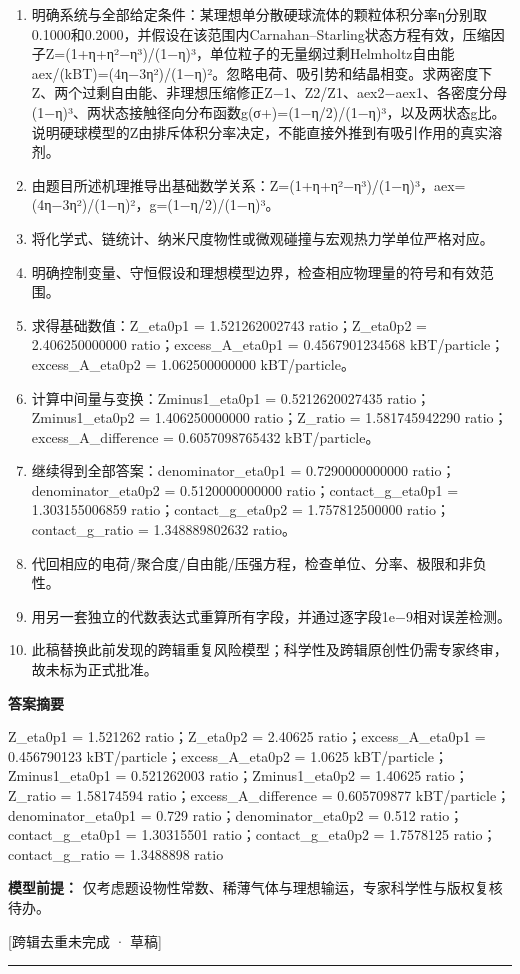 \documentclass[UTF8,11pt,a4paper]{ctexart}
\begin{document}
\begin{enumerate}
\item 明确系统与全部给定条件：某理想单分散硬球流体的颗粒体积分率η分别取0.1000和0.2000，并假设在该范围内Carnahan–Starling状态方程有效，压缩因子Z=(1+η+η²−η³)/(1−η)³，单位粒子的无量纲过剩Helmholtz自由能aex/(kBT)=(4η−3η²)/(1−η)²。忽略电荷、吸引势和结晶相变。求两密度下Z、两个过剩自由能、非理想压缩修正Z−1、Z2/Z1、aex2−aex1、各密度分母(1−η)³、两状态接触径向分布函数g(σ+)=(1−η/2)/(1−η)³，以及两状态g比。说明硬球模型的Z由排斥体积分率决定，不能直接外推到有吸引作用的真实溶剂。
\item 由题目所述机理推导出基础数学关系：Z=(1+η+η²−η³)/(1−η)³，aex=(4η−3η²)/(1−η)²，g=(1−η/2)/(1−η)³。
\item 将化学式、链统计、纳米尺度物性或微观碰撞与宏观热力学单位严格对应。
\item 明确控制变量、守恒假设和理想模型边界，检查相应物理量的符号和有效范围。
\item 求得基础数值：Z\_eta0p1 = 1.521262002743 ratio；Z\_eta0p2 = 2.406250000000 ratio；excess\_A\_eta0p1 = 0.4567901234568 kBT/particle；excess\_A\_eta0p2 = 1.062500000000 kBT/particle。
\item 计算中间量与变换：Zminus1\_eta0p1 = 0.5212620027435 ratio；Zminus1\_eta0p2 = 1.406250000000 ratio；Z\_ratio = 1.581745942290 ratio；excess\_A\_difference = 0.6057098765432 kBT/particle。
\item 继续得到全部答案：denominator\_eta0p1 = 0.7290000000000 ratio；denominator\_eta0p2 = 0.5120000000000 ratio；contact\_g\_eta0p1 = 1.303155006859 ratio；contact\_g\_eta0p2 = 1.757812500000 ratio；contact\_g\_ratio = 1.348889802632 ratio。
\item 代回相应的电荷/聚合度/自由能/压强方程，检查单位、分率、极限和非负性。
\item 用另一套独立的代数表达式重算所有字段，并通过逐字段1e−9相对误差检测。
\item 此稿替换此前发现的跨辑重复风险模型；科学性及跨辑原创性仍需专家终审，故未标为正式批准。
\end{enumerate}
\noindent\textbf{答案摘要}\par
Z\_eta0p1 = 1.521262 ratio；Z\_eta0p2 = 2.40625 ratio；excess\_A\_eta0p1 = 0.456790123 kBT/particle；excess\_A\_eta0p2 = 1.0625 kBT/particle；Zminus1\_eta0p1 = 0.521262003 ratio；Zminus1\_eta0p2 = 1.40625 ratio；Z\_ratio = 1.58174594 ratio；excess\_A\_difference = 0.605709877 kBT/particle；denominator\_eta0p1 = 0.729 ratio；denominator\_eta0p2 = 0.512 ratio；contact\_g\_eta0p1 = 1.30315501 ratio；contact\_g\_eta0p2 = 1.7578125 ratio；contact\_g\_ratio = 1.3488898 ratio\par
\noindent\textbf{模型前提：}
仅考虑题设物性常数、稀薄气体与理想输运，专家科学性与版权复核待办。\par
\noindent\textcolor{red!65!black}{[跨辑去重未完成 · 草稿]} \par
\medskip\hrule\medskip
{}
\end{document}
